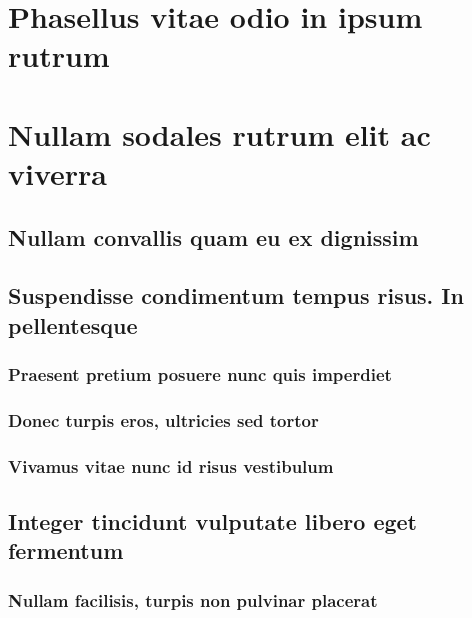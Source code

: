 \documentclass[%
  bachelor,%
  english%
  oneside,%
  debug,%
]{student}
\begin{document}
\lipsum[1-8]

\section{Phasellus vitae odio in ipsum rutrum}

\lipsum[1-8]

\section{Nullam sodales rutrum elit ac viverra}

\lipsum[1-8]

\subsection{Nullam convallis quam eu ex dignissim}

\lipsum[1-8]

\subsection{Suspendisse condimentum tempus risus. In pellentesque}

\lipsum[1-8]

\subsubsection{Praesent pretium posuere nunc quis imperdiet}

\lipsum[1-8]

\subsubsection{Donec turpis eros, ultricies sed tortor}

\lipsum[1-8]

\subsubsection{Vivamus vitae nunc id risus vestibulum}

\lipsum[1-8]

\subsection{Integer tincidunt vulputate libero eget fermentum}

\lipsum[1-8]

\subsubsection{Nullam facilisis, turpis non pulvinar placerat}
\end{document}
